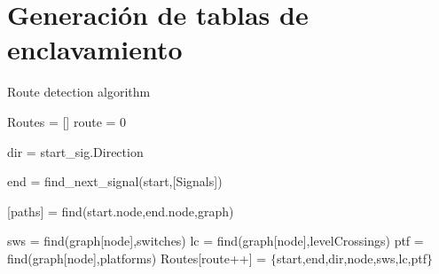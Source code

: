 \section{Generación de tablas de enclavamiento}

\label{sec:rutas}

\lipsum[1]

\begin{algorithm}[hbt!]
        \caption{Route detection algorithm}\label{alg:routes}
        \DontPrintSemicolon
        \SetNoFillComment
        \LinesNotNumbered 
        Routes = []\; 
        route = 0\;
        {
            {
                dir = start\_sig.Direction\;
                
                end = find\_next\_signal(start,[Signals])\;

                [paths] = find(start.node,end.node,graph)\;
                
                {
                    sws = find(graph[node],switches)\;
                    lc = find(graph[node],levelCrossings)\;
                    ptf = find(graph[node],platforms)\;
                    Routes[route++] = $\{$start,end,dir,node,sws,lc,ptf$\}$\;
                }
            }
        }
        \KwResult{[Routes]} 
    \end{algorithm}
